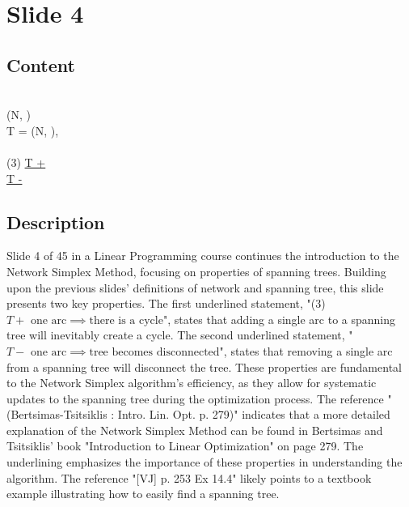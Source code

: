 \documentclass{article}%
\begin{document}
%
\newpage%
\section{Slide 4}%
\label{sec:Slide4}%
\subsection{Content}%

\underline{} \\
\underline{} (N, ) \\
\underline{} T = (N, ),  \\
 \\
(3) \underline{T +  \implies {}} \\
\underline{T -  \implies {}} \\
%
\subsection{Description}%
Slide 4 of 45 in a Linear Programming course continues the introduction to the Network Simplex Method, focusing on properties of spanning trees.  Building upon the previous slides' definitions of network and spanning tree, this slide presents two key properties. The first underlined statement, "(3) $T + \text{ one arc} \implies \text{there is a cycle}$", states that adding a single arc to a spanning tree will inevitably create a cycle. The second underlined statement, "$T - \text{ one arc} \implies \text{tree becomes disconnected}$", states that removing a single arc from a spanning tree will disconnect the tree. These properties are fundamental to the Network Simplex algorithm's efficiency, as they allow for systematic updates to the spanning tree during the optimization process. The reference "(Bertsimas-Tsitsiklis : Intro. Lin. Opt. p. 279)" indicates that a more detailed explanation of the Network Simplex Method can be found in Bertsimas and Tsitsiklis' book "Introduction to Linear Optimization" on page 279. The underlining emphasizes the importance of these properties in understanding the algorithm. The reference "[VJ] p. 253 Ex 14.4" likely points to a textbook example illustrating how to easily find a spanning tree.%
\end{document}
